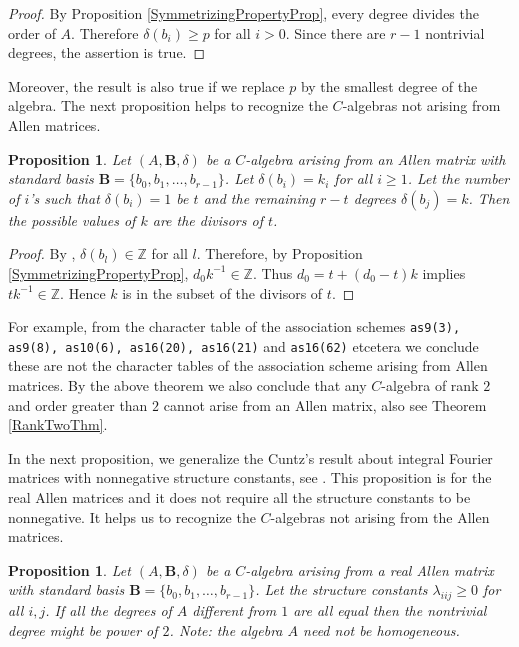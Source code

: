 \documentclass[12pt]{amsart}
\newtheorem{prop}[thm]{Proposition}
\begin{document}
\begin{proof}
By Proposition \ref{SymmetrizingPropertyProp}, every degree divides the order of $A$. Therefore $\delta(b_i)\geq p$ for all $i>0$.  Since there are $r-1$ nontrivial degrees,  the assertion is true.
\end{proof}

Moreover, the result is also true if we replace $p$ by the smallest degree of the algebra. The next proposition helps to recognize the $C$-algebras not arising from Allen matrices.

\begin{prop}Let $(A,{{\mathbf B}}, \delta)$ be a $C$-algebra arising from an Allen matrix with standard  basis ${{\mathbf B}}=\{b_0,b_1,\hdots, b_{r-1}\}$. Let $\delta(b_i)=k_i$ for all $i\geq 1$.  Let the number of $i$'s such that  $\delta(b_i)=1$ be $t$ and the  remaining $r-t$ degrees $\delta(b_j)=k$. Then the possible values of $k$ are the divisors of $t$.
\end{prop}

\begin{proof}
By \cite[Proposition 15]{G1}, $\delta(b_l)\in {{\mathbb Z}}$ for all $l$. Therefore, by Proposition \ref{SymmetrizingPropertyProp},  ${d_0}{k^{-1}}\in {{\mathbb Z}}$. Thus $d_0=t+(d_0-t)k$ implies $tk^{-1} \in {{\mathbb Z}}$. Hence $k$ is in the subset of the divisors of $t$.
\end{proof}

For example, from the character table of the association schemes {\tt as9(3), as9(8), as10(6), as16(20), as16(21)} and {\tt as16(62)} etcetera  we conclude these are not the character tables of the association scheme arising from Allen matrices. By the above theorem we also conclude that any $C$-algebra of rank $2$ and order greater than $2$ cannot arise from an Allen matrix, also see Theorem \ref{RankTwoThm}.

In the next proposition, we generalize the Cuntz's result about integral Fourier matrices with nonnegative structure constants, see \cite{MC1}. This proposition is for the real Allen matrices and it does not require all the structure constants to be nonnegative. It helps us to recognize the $C$-algebras not arising from the Allen matrices.

\begin{prop}
Let $(A,{{\mathbf B}}, \delta)$ be a $C$-algebra arising from a real Allen matrix with standard basis ${{\mathbf B}}=\{b_0,b_1, \hdots,b_{r-1}\}$. Let  the structure constants $\lambda_{iij}\geq 0$ for all $i,j$. If all the degrees of $A$ different from $1$ are all equal then the nontrivial degree might be power of $2$. Note: the algebra $A$  need not be homogeneous.
\end{prop}
\end{document}
